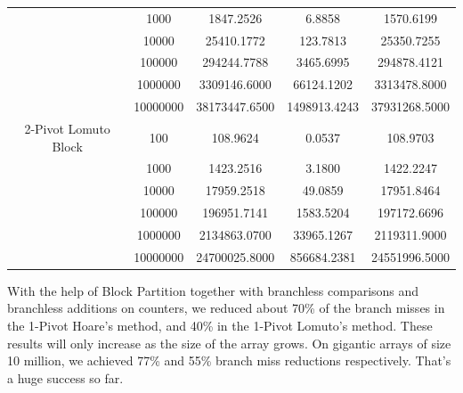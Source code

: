 \documentclass{article}
\begin{document}
\begin{center}
\begin{tabular}{ |c c | c c c| }
                        & 1000     & 1847.2526      & 6.8858        & 1570.6199 \\
                        & 10000    & 25410.1772     & 123.7813      & 25350.7255 \\
                        & 100000   & 294244.7788    & 3465.6995     & 294878.4121 \\
                        & 1000000  & 3309146.6000   & 66124.1202    & 3313478.8000 \\
                        & 10000000 & 38173447.6500  & 1498913.4243  & 37931268.5000 \\
  2-Pivot Lomuto Block  & 100      & 108.9624       & 0.0537        & 108.9703 \\
                        & 1000     & 1423.2516      & 3.1800        & 1422.2247 \\
                        & 10000    & 17959.2518     & 49.0859       & 17951.8464 \\
                        & 100000   & 196951.7141    & 1583.5204     & 197172.6696 \\
                        & 1000000  & 2134863.0700   & 33965.1267    & 2119311.9000 \\
                        & 10000000 & 24700025.8000  & 856684.2381   & 24551996.5000 \\
        \hline
    \end{tabular}
\end{center}

With the help of Block Partition together with branchless comparisons and branchless additions on counters, we reduced about 70\% of the branch misses in the 1-Pivot Hoare's method, and 40\% in the 1-Pivot Lomuto's method. These results will only increase as the size of the array grows.
On gigantic arrays of size 10 million, we achieved 77\% and 55\% branch miss reductions respectively. That's a huge success so far.
\end{document}

